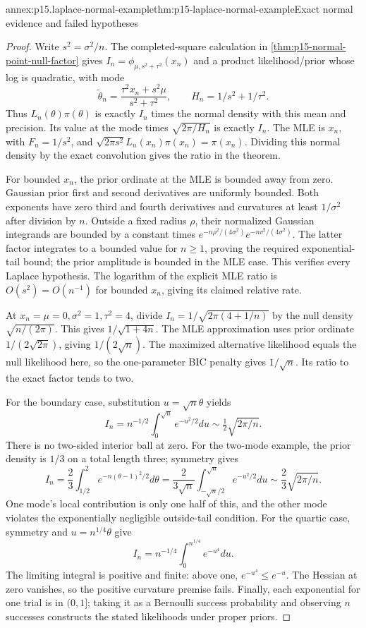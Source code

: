 \begin{annexitem}{annex:p15.laplace-normal-example}{thm:p15-laplace-normal-example}{Exact normal evidence and failed hypotheses}
\begin{proof}
Write \(s^2=\sigma^2/n\). The completed-square calculation in
\cref{thm:p15-normal-point-null-factor} gives
\(I_n=\phi_{\mu,s^2+\tau^2}(x_n)\) and a product likelihood/prior
whose log is quadratic, with mode
\[
 \widetilde\theta_n=\frac{\tau^2x_n+s^2\mu}{s^2+\tau^2},
 \qquad H_n=1/s^2+1/\tau^2.
\]
Thus \(L_n(\theta)\pi(\theta)\) is exactly \(I_n\) times the normal
density with this mean and precision. Its value at the mode times
\(\sqrt{2\pi/H_n}\) is exactly \(I_n\).
The MLE is \(x_n\), with \(F_n=1/s^2\), and
\(\sqrt{2\pi s^2}L_n(x_n)\pi(x_n)=\pi(x_n)\).
Dividing this normal density by the exact convolution gives the ratio
in the theorem.

For bounded \(x_n\), the prior ordinate at the MLE is bounded away from
zero. Gaussian prior first and second derivatives are uniformly bounded.
Both exponents have zero third and fourth derivatives and curvatures
at least \(1/\sigma^2\) after division by \(n\).
Outside a fixed radius \(\rho\), their normalized Gaussian integrands
are bounded by a constant times
\(e^{-n\rho^2/(4\sigma^2)}e^{-n v^2/(4\sigma^2)}\).
The latter factor integrates to a bounded value for \(n\geq1\), proving
the required exponential-tail bound; the prior amplitude is bounded in
the MLE case. This verifies every Laplace hypothesis.
The logarithm of the explicit MLE ratio is \(O(s^2)=O(n^{-1})\)
for bounded \(x_n\), giving its claimed relative rate.

At \(x_n=\mu=0,\sigma^2=1,\tau^2=4\), divide
\(I_n=1/\sqrt{2\pi(4+1/n)}\) by the null density
\(\sqrt{n/(2\pi)}\). This gives \(1/\sqrt{1+4n}\).
The MLE approximation uses prior ordinate \(1/(2\sqrt{2\pi})\),
giving \(1/(2\sqrt n)\). The maximized alternative likelihood equals
the null likelihood here, so the one-parameter BIC penalty gives
\(1/\sqrt n\). Its ratio to the exact factor tends to two.

For the boundary case, substitution \(u=\sqrt n\theta\) yields
\[
 I_n=n^{-1/2}\int_0^{\sqrt n}e^{-u^2/2}du
 \sim\tfrac12\sqrt{2\pi/n}.
\]
There is no two-sided interior ball at zero. For the two-mode example,
the prior density is \(1/3\) on a total length three; symmetry gives
\[
 I_n=\frac23\int_{1/2}^{2}e^{-n(\theta-1)^2/2}d\theta
 =\frac2{3\sqrt n}\int_{-\sqrt n/2}^{\sqrt n}e^{-u^2/2}du
 \sim\frac23\sqrt{2\pi/n}.
\]
One mode's local contribution is only one half of this, and the other
mode violates the exponentially negligible outside-tail condition.
For the quartic case, symmetry and \(u=n^{1/4}\theta\) give
\[
 I_n=n^{-1/4}\int_0^{n^{1/4}}e^{-u^4}du.
\]
The limiting integral is positive and finite: above one,
\(e^{-u^4}\leq e^{-u}\). The Hessian at zero vanishes, so the positive
curvature premise fails. Finally, each exponential for one trial is in
\((0,1]\); taking it as a Bernoulli success probability and observing
\(n\) successes constructs the stated likelihoods under proper priors.
\end{proof}
\end{annexitem}

